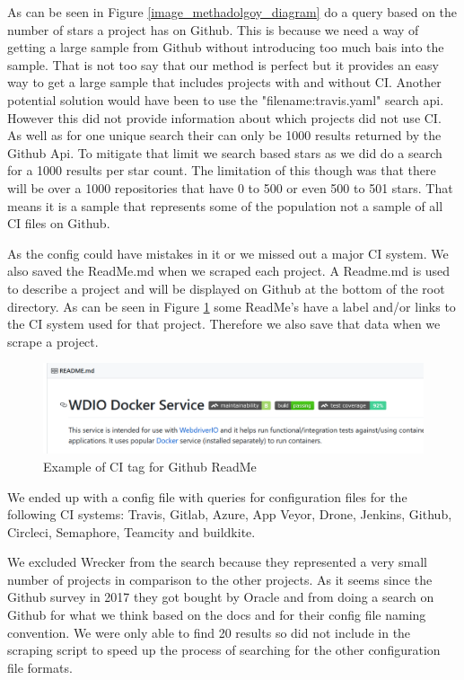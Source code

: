 \documentclass[twoside,12pt,titlepage,a4paper]{article}
\begin{document}
As can be seen in Figure \ref{image_methadolgoy_diagram} do a query based on the number of stars a project has on Github. This is because we need a way of getting a large sample from Github without introducing too much bais into the sample. That is not too say that our method is perfect but it provides an easy way to get a large sample that includes projects with and without CI.
Another potential solution would have been to use the "filename:travis.yaml" search api. However this did not provide information about which projects did not use CI. As well as for one unique search their can only be 1000 results returned by the Github Api. To mitigate that limit we search based stars as we did do a search for a 1000 results per star count. The limitation of this though was that there will be over a 1000 repositories that have 0 to 500 or even 500 to 501 stars. That means it is a sample that represents some of the population not a sample of all CI files on Github. 

As the config could have mistakes in it or we missed out a major CI system. We also saved the ReadMe.md when we scraped each project. A Readme.md is used to describe a project and will be displayed on Github at the bottom of the root directory. As can be seen in Figure \ref{ExampleGithubReadme} some ReadMe's have a label and/or links to the CI system used for that project. Therefore we also save that data when we scrape a project. 

\begin{figure}[h]
  \centering
  \includegraphics[scale=0.5, width=\textwidth]{2020-01-30-08-29-04.png}
  
  \caption[alt text]{Example of CI tag for Github ReadMe \cite{GithubReadMeExample}}
  \label{ExampleGithubReadme}
\end{figure}

We ended up with a config file with queries for configuration files for the following CI systems: Travis, Gitlab, Azure, App Veyor, Drone, Jenkins, Github, Circleci, Semaphore, Teamcity and buildkite. 

We excluded Wrecker from the search because they represented a very small number of projects in comparison to the other projects. As it seems since the Github survey in 2017 they got bought by Oracle and from doing a search on Github for what we think based on the docs \cite{WreckerDocs} and \cite{WreckerOpenSourceGithubSearch} for their config file naming convention. We were only able to find 20 results so did not include in the scraping script to speed up the process of searching for the other configuration file formats.
\end{document}
